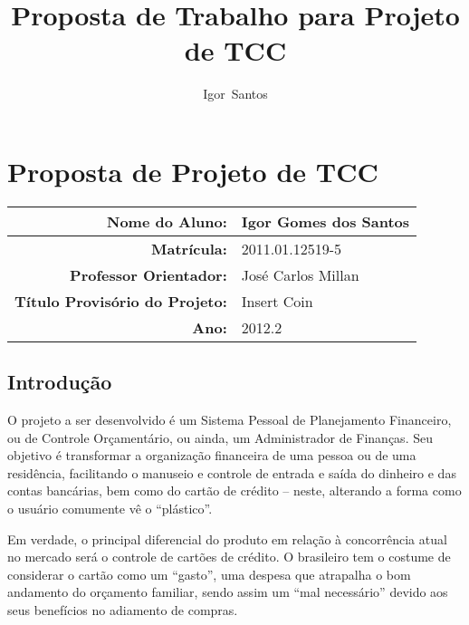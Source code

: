 \documentclass[a4paper]{abnt}
\author{Igor~Santos}
\title{Proposta de Trabalho para Projeto de TCC}
\begin{document}
\maketitle

\chapter{Proposta de Projeto de TCC}

\begin{center}
	\begin{tabular}{|r|l|}
		\hline
		\textbf{Nome do Aluno:} & Igor Gomes dos Santos \\\hline
		\textbf{Matrícula:} & 2011.01.12519-5 \\\hline
		\textbf{Professor Orientador:} & José Carlos Millan \\\hline
		\textbf{Título Provisório do Projeto:} & Insert Coin \\\hline
		\textbf{Ano:} & 2012.2 \\\hline
	\end{tabular}
\end{center}

\section{Introdução}

O projeto a ser desenvolvido é um Sistema Pessoal de Planejamento Financeiro, ou de Controle Orçamentário, ou ainda, um Administrador de
Finanças. Seu objetivo é transformar a organização financeira de uma pessoa ou de uma residência, facilitando o manuseio e controle de entrada e saída do dinheiro e das contas bancárias, bem como do cartão de crédito – neste, alterando a forma como o usuário comumente vê o ``plástico''.

Em verdade, o principal diferencial do produto em relação à concorrência atual no mercado será o controle de cartões de crédito. O brasileiro tem o costume de considerar o cartão como um ``gasto'', uma despesa que atrapalha o bom andamento do orçamento familiar, sendo assim um ``mal necessário'' devido aos seus benefícios no adiamento de compras.
\end{document}
